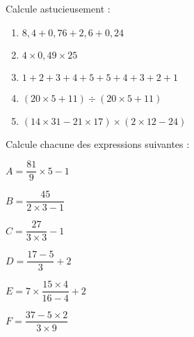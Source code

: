 \begin{exercice}
Calcule astucieusement :
\begin{enumerate}
 \item $8,4 + 0,76 + 2,6 + 0,24$ \dotfill
 \item $4 \times 0,49 \times 25$ \dotfill
 \item $1 + 2 + 3 + 4 + 5 + 5 + 4 + 3 + 2 + 1$ \dotfill

 \dotfill

 \item $(20 \times 5 + 11) \div (20 \times 5 + 11)$ \dotfill
 
 \dotfill
 
 \item $(14 \times  31 - 21 \times  17) \times  (2 \times  12 - 24)$ \dotfill
 
 \dotfill
 \end{enumerate}
\end{exercice}


\newpage

\begin{exercice}
Calcule chacune des expressions suivantes :

$A = \dfrac{81}{9} \times 5 - 1$ \dotfill

\dotfill

$B = \dfrac{45}{2 \times 3 - 1}$ \dotfill

\dotfill

\dotfill

$C = \dfrac{27}{3 \times 3} - 1$ \dotfill

\dotfill

\dotfill

$D = \dfrac{17 - 5}{3} + 2$ \dotfill 

\dotfill

\dotfill

$E = 7 \times \dfrac{15 \times 4}{16 - 4} + 2$ \dotfill 

\dotfill

\dotfill

$F = \dfrac{37 - 5 \times 2}{3 \times 9}$ \dotfill

\dotfill

\dotfill
\end{exercice}




